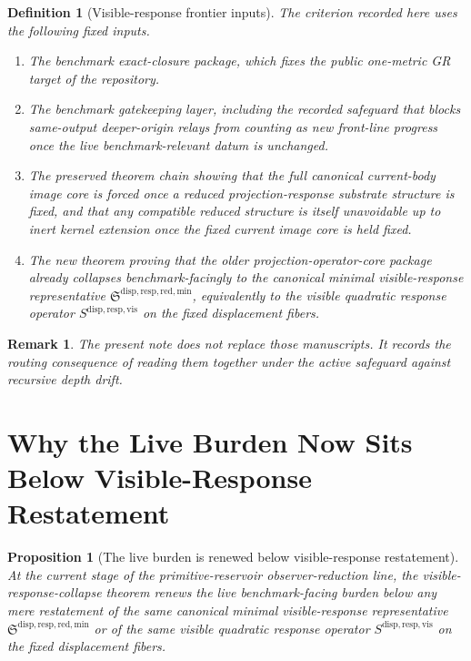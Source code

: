 \documentclass[11pt]{article}
\newcommand{\MinimalReducedStructure}{\mathfrak S^{\mathrm{disp,resp,red,min}}}
\newcommand{\VisibleResponseOperator}{S^{\mathrm{disp,resp,vis}}}
\newtheorem{definition}{Definition}
\newtheorem{proposition}{Proposition}
\newtheorem{remark}{Remark}
\begin{document}
\begin{definition}[Visible-response frontier inputs]
The criterion recorded here uses the following fixed inputs.
\begin{enumerate}
    \item The benchmark exact-closure package, which fixes the public one-metric GR target of the repository.
    \item The benchmark gatekeeping layer, including the recorded safeguard that blocks same-output deeper-origin relays from counting as new front-line progress once the live benchmark-relevant datum is unchanged.
    \item The preserved theorem chain showing that the full canonical current-body image core is forced once a reduced projection-response substrate structure is fixed, and that any compatible reduced structure is itself unavoidable up to inert kernel extension once the fixed current image core is held fixed.
    \item The new theorem proving that the older projection-operator-core package already collapses benchmark-facingly to the canonical minimal visible-response representative \(\MinimalReducedStructure\), equivalently to the visible quadratic response operator \(\VisibleResponseOperator\) on the fixed displacement fibers.
\end{enumerate}
\end{definition}

\begin{remark}
The present note does not replace those manuscripts. It records the routing consequence of reading them together under the active safeguard against recursive depth drift.
\end{remark}

\section{Why the Live Burden Now Sits Below Visible-Response Restatement}

\begin{proposition}[The live burden is renewed below visible-response restatement]
At the current stage of the primitive-reservoir observer-reduction line, the visible-response-collapse theorem renews the live benchmark-facing burden below any mere restatement of the same canonical minimal visible-response representative \(\MinimalReducedStructure\) or of the same visible quadratic response operator \(\VisibleResponseOperator\) on the fixed displacement fibers.
\end{proposition}
\end{document}
